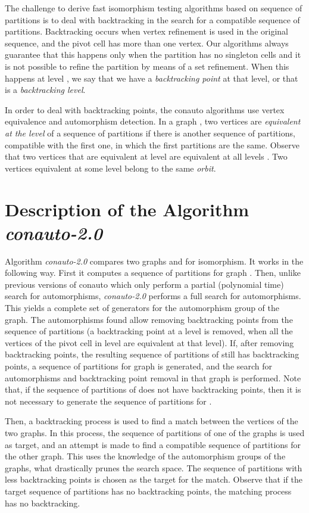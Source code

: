 The challenge to derive fast isomorphism testing algorithms based on sequence of partitions is to deal with backtracking in the search for a compatible sequence of partitions.
Backtracking occurs when vertex refinement is used in the original sequence,
and the pivot cell has more than one vertex. Our algorithms always guarantee that this happens only when the partition has no singleton cells 
and it is not possible to refine the partition by means of a set refinement. When this happens at level , we say that we have a \emph{backtracking point} at that level, or that  is a
\emph{backtracking level}.

In order to deal with backtracking points, the conauto algorithms use vertex equivalence and automorphism detection. 
In a graph , two vertices  are \emph{equivalent at the level } of a sequence of partitions if there is another sequence of partitions, compatible with the first one, in which the first  partitions are the same. 
Observe that two vertices that are equivalent at level  are equivalent at all levels . Two vertices equivalent at some level belong to the same \emph{orbit}.




\section{Description of the Algorithm \emph{conauto-2.0}}
\label{s-algorithm}

Algorithm \emph{conauto-2.0} compares two graphs  and  for isomorphism. It works in the following way. First it computes a sequence of partitions for graph . Then, unlike previous versions of conauto which only perform a partial (polynomial time) search for automorphisms, \emph{conauto-2.0} performs a full search for automorphisms. This yields a complete set of generators for the automorphism group of the graph.  The automorphisms found allow removing backtracking points from the sequence of partitions (a backtracking point at a level  is removed, when all the vertices of the pivot cell in level  are equivalent at that level). If, after removing backtracking points, the resulting sequence of partitions of  still has backtracking points, a sequence of partitions for graph  is generated, and the search for automorphisms and backtracking point removal in that graph is performed. Note that, if the sequence of partitions of  does not have backtracking points, then it is not necessary to generate the sequence of partitions for . 

Then, a backtracking process is used to find a match between the vertices of the two graphs. In this process, the sequence of partitions of one of the graphs is used as target, and an attempt is made to find a compatible sequence of partitions for the other graph. This uses the knowledge of the automorphism groups of the graphs, what drastically prunes the search space. The sequence of partitions with less backtracking points is chosen as the target for the match. Observe that if the target sequence of partitions has no backtracking points, the matching process has no backtracking.

